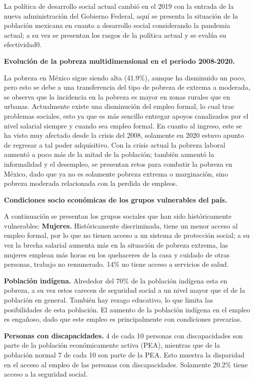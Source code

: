 La política de desarrollo social actual cambió en el 2019 con la entrada de la nueva administración del Gobierno Federal, aquí se presenta la situación de la población mexicana en cuanto a desarrollo social considerando la pandemia actual; a su vez se presentan los rasgos de la política actual y se evalúa su efectividad0.

\textbf{Evolución de la pobreza multidimensional en el periodo 2008-2020.}

La pobreza en México sigue siendo alta (41.9\%), aunque ha disminuido un poco, pero esto se debe a una transferencia del tipo de pobreza de extrema a moderada, se observa que la incidencia en la pobreza es mayor en zonas rurales que en urbanas. Actualmente existe una disminución del empleo formal, lo cual trae problemas sociales, esto ya que es más sencillo entregar apoyos canalizados por el nivel salarial siempre y cuando sea empleo formal.
En cuanto al ingreso, este se ha visto muy afectado desde la crisis del 2008, solamente en 2020 estuvo apunto de regresar a tal poder adquisitivo.
Con la crisis actual la pobreza laboral aumentó a poco más de la mitad de la población; también aumentó la informalidad y el desempleo, se presentan retos para combatir la pobreza en México, dado que ya no es solamente pobreza extrema o marginación, sino pobreza moderada relacionada con la perdida de empleos.

\textbf{Condiciones socio económicas de los grupos vulnerables del país.}

A continuación se presentan los grupos sociales que han sido históricamente vulnerables:
\textbf{Mujeres.} Históricamente discriminada, tiene un menor acceso al empleo formal, por lo que no tienen acceso a un sistema de protección social; a su vez la brecha salarial aumenta más en la situación de pobreza extrema, las mujeres emplean más horas en los quehaceres de la casa y cuidado de otras personas, trabajo no remunerado. 14\% no tiene acceso a servicios de salud.

\textbf{Población indígena.} Alrededor del 70\% de la población indígena esta en pobreza, a su vez estos carecen de seguridad social a un nivel mayor que el de la población en general. También hay rezago educativo, lo que limita las posibilidades de esta población. El aumento de la población indígena en el empleo es engañoso, dado que este empleo es principalmente con condiciones precarias.

\textbf{Personas con discapacidades.} 4 de cada 10 personas con discapacidades son parte de la población económicamente activa (PEA), mientras que de la población normal 7 de cada 10 son parte de la PEA. Esto muestra la disparidad en el acceso al empleo de las personas con discapacidades. Solamente 20.2\% tiene acceso a la seguridad social.

